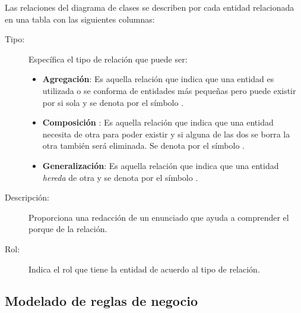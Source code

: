 	Las relaciones del diagrama de clases se describen por cada entidad relacionada en una tabla con las siguientes columnas:

\begin{description}
	\item[Tipo:] Específica el tipo de relación que puede ser:
		\begin{itemize}
			\item \textbf{Agregación}: Es aquella relación que indica que una entidad es utilizada o se conforma de entidades más pequeñas pero puede existir por si sola y se denota por el símbolo \brRelAgregation.
			\item \textbf{Composición} : Es aquella relación que indica que una entidad necesita de otra para poder existir y si alguna de las dos se borra la otra también será eliminada. Se denota por el símbolo \brRelComposition.
			\item \textbf{Generalización}: Es aquella relación que indica que una entidad \textit{hereda} de otra y se denota por el símbolo \brRelGeneralization.
		\end{itemize}
	\item[Descripción:] Proporciona una redacción de un enunciado que ayuda a comprender el porque de la relación.
	\item[Rol:] Indica el rol que tiene la entidad de acuerdo al tipo de relación.
\end{description}




\subsection{Modelado de reglas de negocio}

